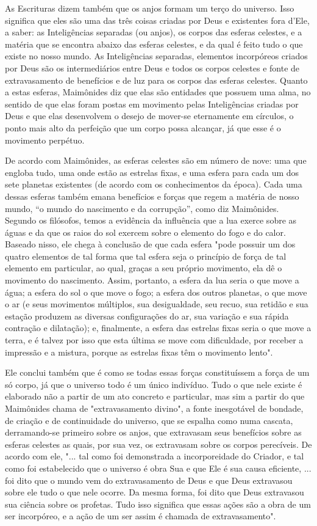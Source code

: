 As Escrituras dizem também que os anjos formam um terço do uni­verso.
Isso significa que eles são uma das três coisas criadas por Deus e
existen­tes fora d'Ele, a saber: as Inteligências separadas (ou anjos),
os corpos das esfe­ras celestes, e a matéria que se encontra abaixo das
esferas celestes, e da qual é feito tudo o que existe no nosso mundo. As
Inteligências separadas, elemen­tos incorpóreos criados por Deus são os
intermediários entre Deus e todos os corpos celestes e fonte de
extravasamento de benefícios e de luz para os cor­pos das esferas
celestes. Quanto a estas esferas, Maimônides diz que elas são entidades
que possuem uma alma, no sentido de que elas foram postas em mo­vimento
pelas Inteligências criadas por Deus e que elas desenvolvem o desejo de
mover-se eternamente em círculos, o ponto mais alto da perfeição que um
corpo possa alcançar, já que esse é o movimento perpétuo.

De acordo com Maimônides, as esferas celestes são em número de nove: uma
que engloba tudo, uma onde estão as estrelas fixas, e uma esfera para
cada um dos sete planetas existentes (de acordo com os conhecimentos da
época). Cada uma dessas esferas também emana benefícios e forças que
re­gem a matéria de nosso mundo, ``o mundo do nascimento e da corrupção'',
como diz Maimônides. Segundo os filósofos, temos a evidência da
influência que a lua exerce sobre as águas e da que os raios do sol
exercem sobre o ele­mento do fogo e do calor. Baseado nisso, ele chega à
conclusão de que cada esfera "pode possuir um dos quatro elementos de
tal forma que tal esfera seja o princípio de força de tal elemento em
particular, ao qual, graças a seu próprio movimento, ela dê o movimento
do nascimento. Assim, portanto, a esfera da lua seria o que move a água;
a esfera do sol o que move o fogo; a esfera dos outros planetas, o que
move o ar (e seus movimentos múltiplos, sua desigual­dade, seu recuo,
sua retidão e sua estação produzem as diversas configurações do ar, sua
variação e sua rápida contração e dilatação); e, finalmente, a esfera
das estrelas fixas seria o que move a terra, e é talvez por isso que
esta última se move com dificuldade, por receber a impressão e a
mistura, porque as estre­las fixas têm o movimento lento".

Ele conclui também que é como se todas essas forças constituíssem a
força de um só corpo, já que o universo todo é um único indivíduo. Tudo
o que nele existe é elaborado não a partir de um ato concreto e
particular, mas sim a partir do que Maimônides chama de "extravasamento
divino", a fonte inesgotável de bondade, de criação e de continuidade do
universo, que se es­palha como numa cascata, derramando-se primeiro
sobre os anjos, que extra­vasam seus benefícios sobre as esferas
celestes as quais, por sua vez, os extrava­sam sobre os corpos
perecíveis. De acordo com ele, "... tal como foi demons­trada a
incorporeidade do Criador, e tal como foi estabelecido que o universo é
obra Sua e que Ele é sua causa eficiente, ... foi dito que o mundo vem
do extravasamento de Deus e que Deus extravasou sobre ele tudo o que
nele ocorre. Da mesma forma, foi dito que Deus extravasou sua ciência
sobre os profetas. Tudo isso significa que essas ações são a obra de um
ser incorpóreo, e a ação de um ser assim é chamada de extravasamento".

